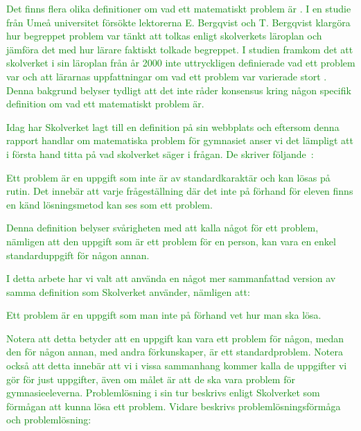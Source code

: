 
\textcolor{green}{Det finns flera olika definitioner om vad ett matematiskt problem är \cite{olikaDefinitioner}. I en studie från Umeå universitet försökte lektorerna E. Bergqvist och T. Bergqvist klargöra hur begreppet problem var tänkt att tolkas enligt skolverkets läroplan och jämföra det med hur lärare faktiskt tolkade begreppet. I studien framkom det att skolverket i sin läroplan från år 2000 inte uttryckligen definierade vad ett problem var och att lärarnas uppfattningar om vad ett problem var varierade stort \cite{problemVarierandeDef}. Denna bakgrund belyser tydligt att det inte råder konsensus kring någon specifik definition om vad ett matematiskt problem är.} 

\textcolor{green}{Idag har Skolverket lagt till en definition på sin webbplats och eftersom denna rapport handlar om matematiska problem för gymnasiet anser vi det lämpligt att i första hand titta på vad skolverket säger i frågan. De skriver följande~\cite{ProblemDef}:}

\begin{displayquote}
\textcolor{green}{Ett problem är en uppgift som inte är av standardkaraktär och kan lösas på rutin. Det innebär att varje frågeställning där det inte på förhand för eleven finns en känd lösningsmetod kan ses som ett problem.}
\end{displayquote}

\noindent\textcolor{green}{Denna definition belyser svårigheten med att kalla något för ett problem, nämligen att den uppgift som är ett problem för en person, kan vara en enkel standarduppgift för någon annan.} 

\textcolor{green}{I detta arbete har vi valt att använda en något mer sammanfattad version av samma definition som Skolverket använder, nämligen att:}

\begin{displayquote}
\textcolor{green}{Ett problem är en uppgift som man inte på förhand vet hur man ska lösa.}
\end{displayquote}

\noindent\textcolor{green}{Notera att detta betyder att en uppgift kan vara ett problem för någon, medan den för någon annan, med andra förkunskaper, är ett standardproblem. Notera också att detta innebär att vi i vissa sammanhang kommer kalla de uppgifter vi gör för just uppgifter, även om målet är att de ska vara problem för gymnasieeleverna.}
\textcolor{green}{Problemlösning i sin tur beskrivs enligt Skolverket som förmågan att kunna lösa ett problem. Vidare beskrivs problemlösningsförmåga och problemlösning:}

